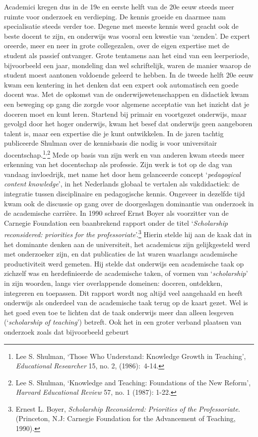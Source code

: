 \documentclass[smallauthor, chapterhaspagenum, nochapterinheader, pagenuminheader,  bigchapnum,medium2, tocpages,  garamond, titleinheader]{jote-book}
\begin{document}
	Academici kregen dus in de 19e en eerste helft van de 20e eeuw steeds meer ruimte voor onderzoek en verdieping. De kennis groeide en daarmee nam specialisatie steeds verder toe. Degene met meeste kennis werd geacht ook de beste docent te zijn, en onderwijs was vooral een kwestie van ‘zenden'. De expert oreerde, meer en neer in grote collegezalen, over de eigen expertise met de student als passief ontvanger. Grote tentamens aan het eind van een leerperiode, bijvoorbeeld een jaar, mondeling dan wel schriftelijk, waren de manier waarop de student moest aantonen voldoende geleerd te hebben. In de tweede helft 20e eeuw kwam een kentering in het denken dat een expert ook automatisch een goede docent was. Met de opkomst van de onderwijswetenschappen en didactiek kwam een beweging op gang die zorgde voor algemene acceptatie van het inzicht dat je doceren moet en kunt leren. Startend bij primair en voortgezet onderwijs, maar gevolgd door het hoger onderwijs, kwam het besef dat onderwijs geen aangeboren talent is, maar een expertise die je kunt ontwikkelen. In de jaren tachtig publiceerde Shulman over de kennisbasis die nodig is voor universitair docentschap.\footnote{Lee S. Shulman, ‘Those Who Understand: Knowledge Growth in Teaching', \emph{Educational}\emph{ Researcher }15, no. 2, (1986): 4-14.}\textsuperscript{,}\footnote{Lee S. Shulman, ‘Knowledge and Teaching: Foundations of the New Reform', \emph{Harvard }\emph{Educational}\emph{ Review }57, no. 1 (1987): 1-22.} Mede op basis van zijn werk en van anderen kwam steeds meer erkenning van het docentschap als professie. Zijn werk is tot op de dag van vandaag invloedrijk, met name het door hem gelanceerde concept ‘\emph{pedagogical}\emph{ content }\emph{knowledge}', in het Nederlands globaal te vertalen als vakdidactiek: de integratie tussen disciplinaire en pedagogische kennis. Ongeveer in dezelfde tijd kwam ook de discussie op gang over de doorgeslagen dominantie van onderzoek in de academische carrière. In 1990 schreef Ernst Boyer als voorzitter van de Carnegie Foundation een baanbrekend rapport onder de titel ‘\emph{Scholarship}\emph{ }\emph{reconsidered}\emph{: }\emph{priorities}\emph{ }\emph{for}\emph{ }\emph{the}\emph{ }\emph{professoriate}'.\footnote{Ernest L. Boyer, \emph{Scholarship}\emph{ }\emph{Reconsidered}\emph{: }\emph{Priorities}\emph{ of }\emph{the}\emph{ }\emph{Professoriate}. (Princeton, N.J: Carnegie Foundation for the Advancement of Teaching, 1990). } Hierin stelde hij aan de kaak dat in het dominante denken aan de universiteit, het academicus zijn gelijkgesteld werd met onderzoeker zijn, en dat publicaties de lat waren waarlangs academische productiviteit werd gemeten. Hij stelde dat onderwijs een academische taak op zichzelf was en herdefinieerde de academische taken, of vormen van ‘\emph{scholarship}' in zijn woorden, langs vier overlappende domeinen: doceren, ontdekken, integreren en toepassen. Dit rapport wordt nog altijd veel aangehaald en heeft onderwijs als onderdeel van de academische taak terug op de kaart gezet. Wel is het goed even toe te lichten dat de taak onderwijs meer dan alleen lesgeven (‘\emph{scholarship}\emph{ of teaching}') betreft. Ook het in een groter verband plaatsen van onderzoek zoals dat bijvoorbeeld gebeurt 
\end{document}
